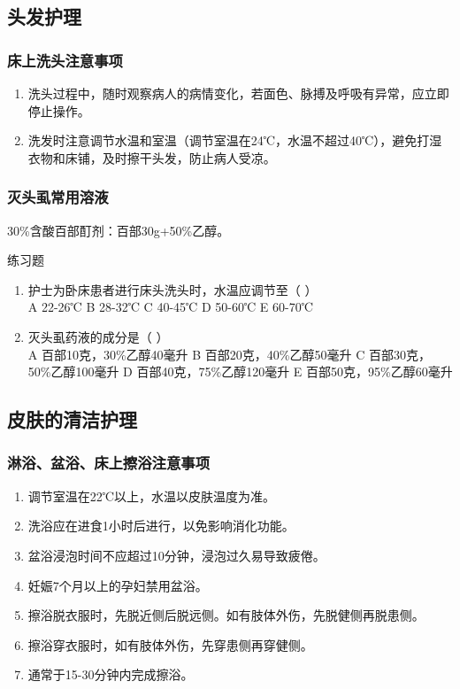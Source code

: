 \documentclass[11pt, a4paper]{ctexart}
\begin{document}
\subsection{头发护理}
\subsubsection{床上洗头注意事项}
\begin{enumerate}
	\item 洗头过程中，随时观察病人的病情变化，若面色、脉搏及呼吸有异常，应立即停止操作。
	\item 洗发时注意调节水温和室温（调节室温在24℃，水温不超过40℃），避免打湿衣物和床铺，及时擦干头发，防止病人受凉。
\end{enumerate}

\subsubsection{灭头虱常用溶液}
30\%含酸百部酊剂：百部30g+50\%乙醇。

\begin{examplebox}{练习题}
	\begin{enumerate}
		\item 护士为卧床患者进行床头洗头时，水温应调节至（ ）\\
		      A 22-26℃ \quad B 28-32℃ \quad C 40-45℃ \quad D 50-60℃ \quad E 60-70℃
		\item 灭头虱药液的成分是（ ）\\
		      A 百部10克，30\%乙醇40毫升 \quad B 百部20克，40\%乙醇50毫升 \quad C 百部30克，50\%乙醇100毫升 \quad D 百部40克，75\%乙醇120毫升 \quad E 百部50克，95\%乙醇60毫升
	\end{enumerate}
\end{examplebox}

\subsection{皮肤的清洁护理}
\subsubsection{淋浴、盆浴、床上擦浴注意事项}
\begin{enumerate}
	\item 调节室温在22℃以上，水温以皮肤温度为准。
	\item 洗浴应在进食1小时后进行，以免影响消化功能。
	\item 盆浴浸泡时间不应超过10分钟，浸泡过久易导致疲倦。
	\item 妊娠7个月以上的孕妇禁用盆浴。
	\item 擦浴脱衣服时，先脱近侧后脱远侧。如有肢体外伤，先脱健侧再脱患侧。
	\item 擦浴穿衣服时，如有肢体外伤，先穿患侧再穿健侧。
	\item 通常于15-30分钟内完成擦浴。
\end{enumerate}
\end{document}
